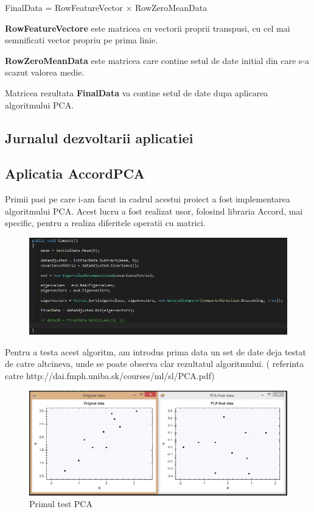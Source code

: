 \documentclass[12pt]{article}
\begin{document}
FinalData = RowFeatureVector $\times$ RowZeroMeanData

\textbf{RowFeatureVectore} este matricea cu vectorii proprii transpusi, cu cel mai semnificati vector propriu pe prima linie.

\textbf{RowZeroMeanData} este matricea care contine setul de date initial din care s-a scazut valorea medie.

Matricea rezultata \textbf{FinalData} va contine setul de date dupa aplicarea algoritmului PCA.
\newpage

\subsection{Jurnalul dezvoltarii aplicatiei}

\subsection{Aplicatia AccordPCA}
Primii pasi pe care i-am facut in cadrul acestui proiect a fost implementarea algoritmului PCA. Acest lucru a fost realizat usor, folosind libraria Accord, mai specific, pentru a realiza diferitele operatii cu matrici. 

\begin{figure}[H]
\centering
\includegraphics[width=\linewidth]{Compute}
\end{figure}

Pentru a testa acest algoritm, am introdus prima data un set de date deja testat de catre altcineva, unde se poate observa clar rezultatul algoritmului. ( referinta catre http://dai.fmph.uniba.sk/courses/ml/sl/PCA.pdf) 
\begin{figure}[H]
\centering
\caption{Primul test PCA}
\includegraphics[width=\linewidth]{Test1}
\end{figure}
\newpage
\end{document}
